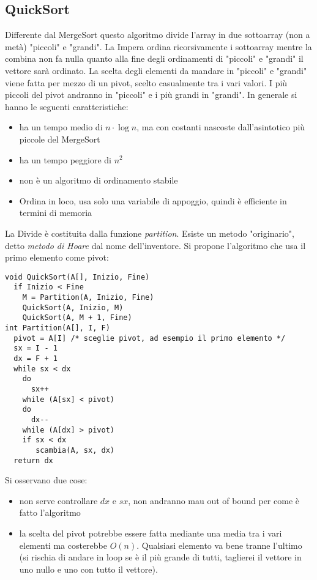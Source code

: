 \documentclass[a4paper,12pt,oneside,tikz]{book}
\begin{document}
\subsection{QuickSort}
Differente dal MergeSort questo algoritmo divide l'array in due sottoarray (non a metà) "piccoli" e "grandi". La Impera ordina ricorsivamente i sottoarray mentre la combina non fa nulla quanto alla fine degli ordinamenti di "piccoli" e "grandi" il vettore sarà ordinato. La scelta degli elementi da mandare in "piccoli" e "grandi" viene fatta per mezzo di un pivot, scelto casualmente tra i vari valori. I più piccoli del pivot andranno in "piccoli" e i più grandi in "grandi". In generale si hanno le seguenti caratteristiche:
\begin{itemize}
	\item ha un tempo medio di $n\cdot\log n$, ma con costanti nascoste dall'asintotico più piccole del MergeSort
	\item ha un tempo peggiore di $n^2$
	\item non è un algoritmo di ordinamento stabile
	\item Ordina in loco, usa solo una variabile di appoggio, quindi è efficiente in termini di memoria
\end{itemize}
La Divide è costituita dalla funzione \textit{partition}. Esiste un metodo "originario", detto \textit{metodo di Hoare} dal nome dell'inventore.
Si propone l'algoritmo che usa il primo elemento come pivot:
\begin{verbatim}
void QuickSort(A[], Inizio, Fine)
  if Inizio < Fine
    M = Partition(A, Inizio, Fine)
    QuickSort(A, Inizio, M)
    QuickSort(A, M + 1, Fine)
int Partition(A[], I, F)
  pivot = A[I] /* sceglie pivot, ad esempio il primo elemento */
  sx = I - 1
  dx = F + 1
  while sx < dx
    do
      sx++
    while (A[sx] < pivot)
    do
      dx--
    while (A[dx] > pivot)
    if sx < dx
       scambia(A, sx, dx)
  return dx
\end{verbatim}
\newpage
Si osservano due cose:
\begin{itemize}
	\item non serve controllare $dx$ e $sx$, non andranno mau out of bound per come è fatto l'algoritmo
	\item la scelta del pivot potrebbe essere fatta mediante una media tra i vari elementi ma costerebbe $O(n)$. Qualsiasi elemento va bene tranne l'ultimo (si rischia di andare in loop se è il più grande di tutti, taglierei il vettore in uno nullo e uno con tutto il vettore).
\end{itemize}
\end{document}
